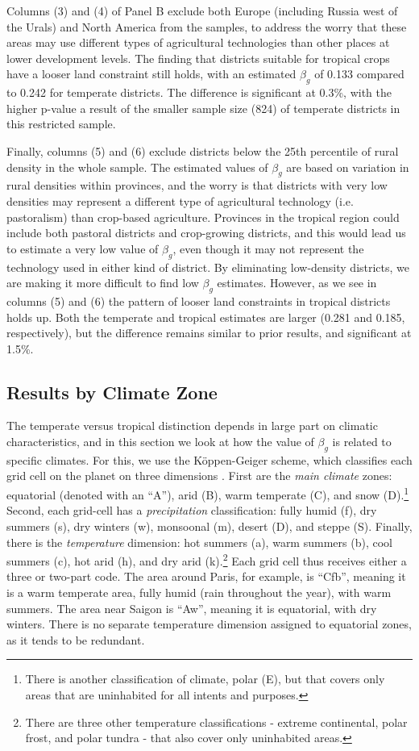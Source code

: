 \documentclass[11pt]{article}
\begin{document}
Columns (3) and (4) of Panel B exclude both Europe (including Russia west of the Urals) and North America from the samples, to address the worry that these areas may use different types of agricultural technologies than other places at lower development levels. The finding that districts suitable for tropical crops have a looser land constraint still holds, with an estimated $\beta_g$ of 0.133 compared to 0.242 for temperate districts. The difference is significant at 0.3\%, with the higher p-value a result of the smaller sample size (824) of temperate districts in this restricted sample.

Finally, columns (5) and (6) exclude districts below the 25th percentile of rural density in the whole sample. The estimated values of $\beta_g$ are based on variation in rural densities within provinces, and the worry is that districts with very low densities may represent a different type of agricultural technology (i.e. pastoralism) than crop-based agriculture. Provinces in the tropical region could include both pastoral districts and crop-growing districts, and this would lead us to estimate a very low value of $\beta_g$, even though it may not represent the technology used in either kind of district. By eliminating low-density districts, we are making it more difficult to find low $\beta_g$ estimates. However, as we see in columns (5) and (6) the pattern of looser land constraints in tropical districts holds up. Both the temperate and tropical estimates are larger (0.281 and 0.185, respectively), but the difference remains similar to prior results, and significant at 1.5\%.

\subsection{Results by Climate Zone}
The temperate versus tropical distinction depends in large part on climatic characteristics, and in this section we look at how the value of $\beta_g$ is related to specific climates. For this, we use the K{\"o}ppen-Geiger scheme, which classifies each grid cell on the planet on three dimensions \citep{kottek2006}. First are the \textit{main climate} zones: equatorial (denoted with an ``A''), arid (B), warm temperate (C), and snow (D).\footnote{There is another classification of climate, polar (E), but that covers only areas that are uninhabited for all intents and purposes.} Second, each grid-cell has a \textit{precipitation} classification: fully humid (f), dry summers (s), dry winters (w), monsoonal (m), desert (D), and steppe (S). Finally, there is the \textit{temperature} dimension: hot summers (a), warm summers (b), cool summers (c), hot arid (h), and dry arid (k).\footnote{There are three other temperature classifications - extreme continental, polar frost, and polar tundra - that also cover only uninhabited areas.} Each grid cell thus receives either a three or two-part code. The area around Paris, for example, is ``Cfb'', meaning it is a warm temperate area, fully humid (rain throughout the year), with warm summers. The area near Saigon is ``Aw'', meaning it is equatorial, with dry winters. There is no separate temperature dimension assigned to equatorial zones, as it tends to be redundant.
\end{document}
